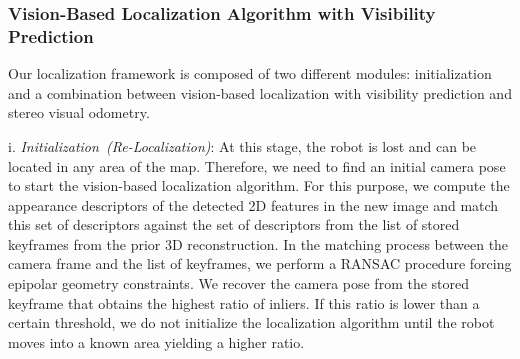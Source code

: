 \subsubsection{Vision-Based Localization Algorithm with Visibility Prediction}\label{sec:vision_algorithm}
Our localization framework is composed of two different modules: initialization and a combination between vision-based localization with visibility prediction and stereo visual odometry. 

i. \textit{Initialization~(Re-Localization)}: At this stage, the robot is lost and can be located in any area of the map. Therefore, we need to find an initial camera pose to start the vision-based localization algorithm. For this purpose, we compute the appearance descriptors of the detected 2D features in the new image and match this set of descriptors against the set of descriptors from the list of stored keyframes from the prior 3D reconstruction. In the matching process between the camera frame and the list of keyframes, we perform a RANSAC procedure forcing epipolar geometry constraints. We recover the camera pose from the stored keyframe that obtains the highest ratio of inliers. If this ratio is lower than a certain threshold, we do not initialize the localization algorithm until the robot moves into a known area yielding a higher ratio.

